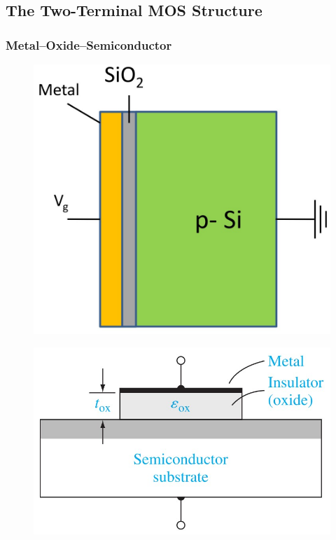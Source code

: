 \documentclass{beamer}
\begin{document}
\subsection{The Two-Terminal MOS Structure}
    \begin{frame} \frametitle{Metal–Oxide–Semiconductor}
        \begin{minipage}{\linewidth}
            \begin{minipage}{0.45\linewidth}
                \begin{figure}[H]
                    \centering
                    \includegraphics[width=0.8\linewidth]{MOS-graph-horizontal.jpg}
                    \label{fig:MOS-graph-horizontal.jpg}
                \end{figure}
            \end{minipage}
            \begin{minipage}{0.45\linewidth}
                \begin{figure}[H]
                    \centering
                    \includegraphics[width=0.8\linewidth]{MOS-graph-vertical.jpg}

\end{figure}
\end{minipage}
\end{minipage}
\end{frame}
\end{document}
